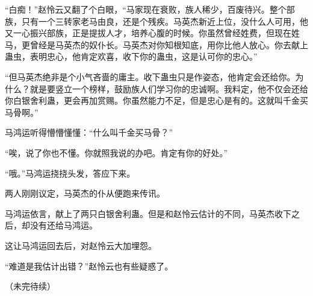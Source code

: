\begin{this_body}
“白痴！”赵怜云又翻了个白眼，“马家现在衰败，族人稀少，百废待兴。整个部族，只有一个三转家老马由良，还是个残疾。马英杰新近上位，没什么人可用，他又一心振兴部族，正是提拔人才，培养心腹的时候。你虽然曾经姓费，但现在姓马，更曾经是马英杰的奴仆长。马英杰对你知根知底，用你比他人放心。你去献上蛊虫，表明忠心，他肯定欢喜，收下你的蛊虫，这是认可你的忠心。”

“但马英杰绝非是个小气吝啬的庸主。收下蛊虫只是作姿态，他肯定会还给你。为什么？就是要竖立一个榜样，鼓励族人们学习你的忠诚啊。我料定，他不仅会还给你白银舍利蛊，更会再加赏赐。你虽然能力不足，但是忠心是有的。这就叫千金买马骨啊。”

马鸿运听得懵懵懂懂：“什么叫千金买马骨？”

“唉，说了你也不懂。你就照我说的办吧。肯定有你的好处。”

“哦。”马鸿运挠挠头发，答应下来。

两人刚刚议定，马英杰的仆从便跑来传讯。

马鸿运依言，献上了两只白银舍利蛊。但是和赵怜云估计的不同，马英杰收下之后，却没有还给马鸿运。

这让马鸿运回去后，对赵怜云大加埋怨。

“难道是我估计出错？”赵怜云也有些疑惑了。

（未完待续）

\end{this_body}

